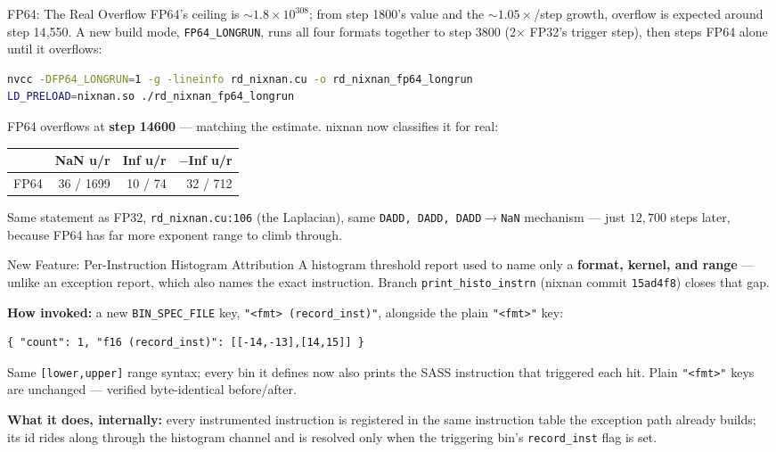\documentclass{beamer}
\begin{document}
\begin{frame}[fragile]{FP64: The Real Overflow}
FP64's ceiling is $\sim\!1.8\times10^{308}$; from step 1800's value and
the ${\sim}1.05\times$/step growth, overflow is expected around step
14{,}550. A new build mode, \texttt{FP64\_LONGRUN}, runs all four formats
together to step 3800 (2$\times$ FP32's trigger step), then steps FP64
alone until it overflows:
\begin{lstlisting}[language=bash]
nvcc -DFP64_LONGRUN=1 -g -lineinfo rd_nixnan.cu -o rd_nixnan_fp64_longrun
LD_PRELOAD=nixnan.so ./rd_nixnan_fp64_longrun
\end{lstlisting}
FP64 overflows at \textbf{step 14600} --- matching the estimate. nixnan
now classifies it for real:
\begin{center}
\begin{tabular}{lrrr}
\toprule
 & NaN u/r & Inf u/r & $-$Inf u/r \\
\midrule
FP64 & 36 / 1699 & 10 / 74 & 32 / 712 \\
\bottomrule
\end{tabular}
\end{center}
Same statement as FP32, \texttt{rd\_nixnan.cu:106} (the Laplacian), same
\texttt{DADD, DADD, DADD}$\to$\texttt{NaN} mechanism --- just $12{,}700$
steps later, because FP64 has far more exponent range to climb through.
\end{frame}

\begin{frame}[fragile]{New Feature: Per-Instruction Histogram Attribution}
A histogram threshold report used to name only a \textbf{format, kernel,
and range} --- unlike an exception report, which also names the exact
instruction. Branch \texttt{print\_histo\_instrn} (nixnan commit
\texttt{15ad4f8}) closes that gap.

\vspace{0.3cm}
\textbf{How invoked:} a new \texttt{BIN\_SPEC\_FILE} key,
\texttt{"<fmt> (record\_inst)"}, alongside the plain \texttt{"<fmt>"} key:
\begin{lstlisting}
{ "count": 1, "f16 (record_inst)": [[-14,-13],[14,15]] }
\end{lstlisting}
Same \texttt{[lower,upper]} range syntax; every bin it defines now also
prints the SASS instruction that triggered each hit. Plain \texttt{"<fmt>"}
keys are unchanged --- verified byte-identical before/after.

\vspace{0.2cm}
\textbf{What it does, internally:} every instrumented instruction is
registered in the same instruction table the exception path already
builds; its id rides along through the histogram channel and is resolved
only when the triggering bin's \texttt{record\_inst} flag is set.
\end{frame}
\end{document}
